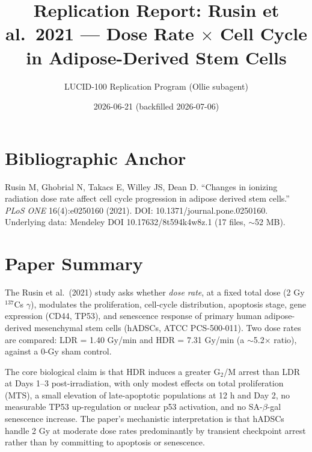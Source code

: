 \documentclass[11pt]{article}
\title{Replication Report: Rusin et al.\ 2021 --- Dose Rate $\times$ Cell Cycle in Adipose-Derived Stem Cells}
\author{LUCID-100 Replication Program (Ollie subagent)}
\date{2026-06-21 (backfilled 2026-07-06)}
\begin{document}
\maketitle

\section*{Bibliographic Anchor}
Rusin M, Ghobrial N, Takacs E, Willey JS, Dean D.
``Changes in ionizing radiation dose rate affect cell cycle progression in adipose derived stem cells.''
\emph{PLoS ONE} 16(4):e0250160 (2021). DOI: 10.1371/journal.pone.0250160.
Underlying data: Mendeley DOI 10.17632/8t594k4w8z.1 (17 files, $\sim$52 MB).

\section{Paper Summary}
The Rusin et al.\ (2021) study asks whether \emph{dose rate}, at a fixed total dose (2 Gy $^{137}$Cs $\gamma$),
modulates the proliferation, cell-cycle distribution, apoptosis stage, gene expression (CD44, TP53),
and senescence response of primary human adipose-derived mesenchymal stem cells (hADSCs, ATCC PCS-500-011).
Two dose rates are compared: LDR = 1.40 Gy/min and HDR = 7.31 Gy/min (a $\sim$5.2$\times$ ratio),
against a 0-Gy sham control.

The core biological claim is that HDR induces a greater G$_2$/M arrest than LDR at Days 1--3 post-irradiation,
with only modest effects on total proliferation (MTS), a small elevation of late-apoptotic populations at
12 h and Day 2, no measurable TP53 up-regulation or nuclear p53 activation, and no SA-$\beta$-gal senescence
increase. The paper's mechanistic interpretation is that hADSCs handle 2 Gy at moderate dose rates
predominantly by transient checkpoint arrest rather than by committing to apoptosis or senescence.
\end{document}

